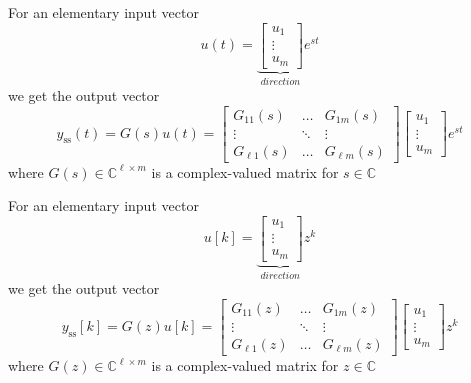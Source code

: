 
For an elementary input vector
\begin{equation*}
    u(t)=\underbrace{\begin{bmatrix}u_{1}  \\
            \vdots \\
            u_{m}
        \end{bmatrix}}_{direction} e^{st}
\end{equation*}
we get the output vector
\begin{equation*}
    y_{{\mathrm{ss}}}(t)=G(s)u(t)=
    \begin{bmatrix}G_{11}(s)    & \ldots & G_{1m}(s)     \\
               \vdots       & \ddots & \vdots        \\
               G_{\ell1}(s) & \ldots & G_{\ell m}(s)
    \end{bmatrix}
    \begin{bmatrix}u_{1}  \\
        \vdots \\
        u_{m}
    \end{bmatrix}e^{st}
\end{equation*}
where $G(s)\in\mathbb{C}^{\ell\times m}$ is a complex-valued matrix for $s\in \mathbb{C}$


For an elementary input vector
\begin{equation*}
    u[k]=\underbrace{\begin{bmatrix}u_{1}  \\
            \vdots \\
            u_{m}
        \end{bmatrix}}_{direction} z^k
\end{equation*}
we get the output vector
\begin{equation*}
    y_{{\mathrm{ss}}}[k]=G(z)u[k]=
    \begin{bmatrix}G_{11}(z)    & \ldots & G_{1m}(z)     \\
               \vdots       & \ddots & \vdots        \\
               G_{\ell1}(z) & \ldots & G_{\ell m}(z)
    \end{bmatrix}
    \begin{bmatrix}u_{1}  \\
        \vdots \\
        u_{m}
    \end{bmatrix}z^k
\end{equation*}
where $G(z)\in\mathbb{C}^{\ell\times m}$ is a complex-valued matrix for $z\in \mathbb{C}$

